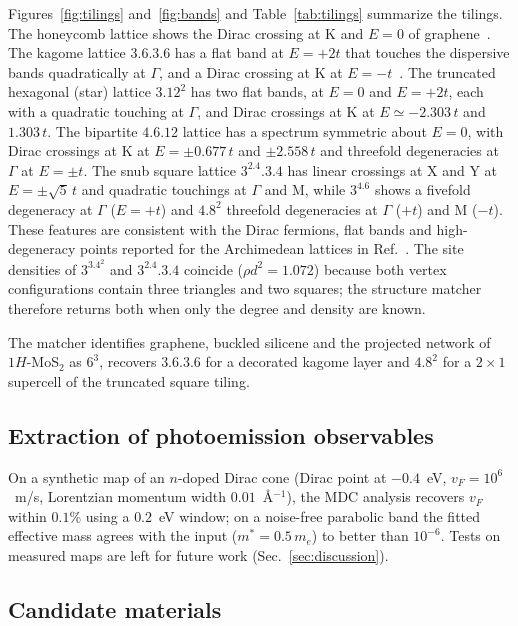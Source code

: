 \documentclass[prmaterials,twocolumn,superscriptaddress,longbibliography,nofootinbib]{revtex4-2}
\begin{document}
Figures~\ref{fig:tilings} and~\ref{fig:bands} and Table~\ref{tab:tilings} summarize the
tilings. The honeycomb lattice shows the Dirac crossing at K and $E=0$ of
graphene~\cite{CastroNeto2009}. The kagome lattice $3.6.3.6$ has a flat band at $E=+2t$
that touches the dispersive bands quadratically at $\Gamma$, and a Dirac crossing at K at
$E=-t$~\cite{Sutherland1986}. The truncated hexagonal (star) lattice $3.12^2$ has two flat
bands, at $E=0$ and $E=+2t$, each with a quadratic touching at $\Gamma$, and Dirac crossings
at K at $E\simeq-2.303\,t$ and $1.303\,t$. The bipartite $4.6.12$ lattice has a spectrum
symmetric about $E=0$, with Dirac crossings at K at $E=\pm0.677\,t$ and $\pm2.558\,t$ and
threefold degeneracies at $\Gamma$ at $E=\pm t$. The snub square lattice $3^2.4.3.4$ has
linear crossings at X and Y at $E=\pm\sqrt5\,t$ and quadratic touchings at $\Gamma$ and M,
while $3^4.6$ shows a fivefold degeneracy at $\Gamma$ ($E=+t$) and $4.8^2$ threefold
degeneracies at $\Gamma$ ($+t$) and M ($-t$). These features are consistent with the Dirac
fermions, flat bands and high-degeneracy points reported for the Archimedean lattices in
Ref.~. The site densities of $3^3.4^2$ and $3^2.4.3.4$ coincide
($\rho d^2=1.072$) because both vertex configurations contain three triangles and two squares;
the structure matcher therefore returns both when only the degree and density are known.

The matcher identifies graphene, buckled silicene and the projected network of $1H$-MoS$_2$
as $6^3$, recovers $3.6.3.6$ for a decorated kagome layer and $4.8^2$ for a $2\times1$
supercell of the truncated square tiling.

\subsection{Extraction of photoemission observables}

On a synthetic map of an $n$-doped Dirac cone (Dirac point at $-0.4$~eV,
$v_F=10^6$~m/s, Lorentzian momentum width $0.01$~\AA$^{-1}$), the MDC analysis recovers
$v_F$ within $0.1\%$ using a $0.2$~eV window; on a noise-free parabolic band the fitted
effective mass agrees with the input ($m^\ast=0.5\,m_e$) to better than $10^{-6}$. Tests on
measured maps are left for future work (Sec.~\ref{sec:discussion}).

\subsection{Candidate materials}
\end{document}
